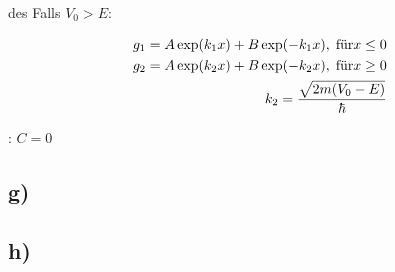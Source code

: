 \justifying des Falls $V_0 > E$:

\begin{align*}
    g_1 = A \exp(k_1 x) + B \exp (\-- k_1 x) , \; \text{für} x \leq 0\\
    g_2 = A \exp(k_2 x) + B \exp (\-- k_2 x) , \; \text{für} x \geq 0\\
    k_2 = \frac{\sqrt{2m (V_0-E)}}{\hbar}
\end{align*}

\justifying: $C=0$

 

\subsection{g)}



\subsection{h)}





